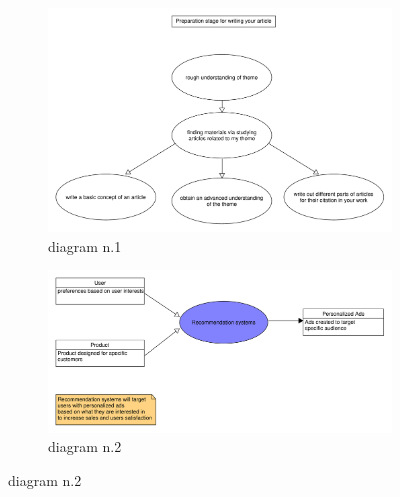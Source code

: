 \documentclass[10pt,twoside,english,a4paper]{article}
\begin{document}
\begin{figure}[h]
	\caption{UMLet diagrams}
	\label{fig:umletdiag}
	\begin{subfigure}[b]{0.5\textwidth}
		\centering
		\includegraphics[width=1\textwidth]{diagram_1.pdf}
		\caption{diagram n.1}
	\end{subfigure}
	\begin{subfigure}[b]{0.5\textwidth}
		\centering
		\includegraphics[width=1\textwidth]{diagram_2.pdf}
		\caption{diagram n.2}
	\end{subfigure}

\end{figure}



% 
\end{document}
